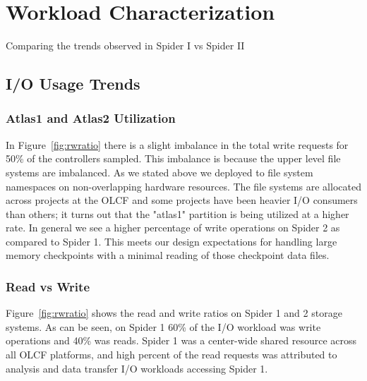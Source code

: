\section{Workload Characterization}
\label{sec:workloadchar}



Comparing the trends observed in Spider I vs Spider II



\subsection{I/O Usage Trends}



\subsubsection{Atlas1 and Atlas2 Utilization}
In Figure~\ref{fig:rwratio} there is a slight imbalance in the total write 
requests for 50\% of the controllers sampled. This imbalance is because the upper 
level file systems are imbalanced. As we stated above we deployed to file system 
namespaces on  non-overlapping hardware resources. The file systems are allocated 
across projects at the OLCF and some projects have been heavier I/O consumers than 
others; it turns out that the "atlas1" partition is being utilized at a higher rate.
In general we see a higher percentage of write operations on Spider 2 as compared
to Spider 1. This meets our design expectations for handling large memory checkpoints
with a minimal reading of those checkpoint data files.

\subsubsection{Read vs Write}

Figure~\ref{fig:rwratio} shows the read and write ratios on Spider 1 and 2
storage systems. As can be seen, on Spider 1 60\% of the I/O workload was write
operations and 40\% was reads. Spider 1 was a center-wide shared resource
across all OLCF platforms, and high percent of the read requests was attributed
to analysis and data transfer I/O workloads accessing Spider 1. 

